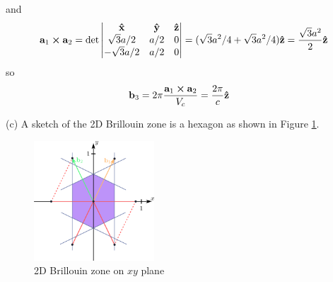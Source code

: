 \documentclass[../main.tex]{subfiles}
\begin{document}
and 
\begin{align*}
    \vb{a}_1 \cross \vb{a}_2 = \det\begin{vmatrix}
        \vu{x} & \vu{y} & \vu{z} \\
        \sqrt{3}a/2 & a/2 & 0 \\
        -\sqrt{3}a/2 & a/2 & 0
    \end{vmatrix} = (\sqrt{3}a^2/4 + \sqrt{3}a^2/4) \vu{z} = \frac{\sqrt{3}a^2}{2} \vu{z}
\end{align*}
so
\begin{align*}
    \vb{b}_3 &= 2\pi \frac{\vb{a}_1 \cross \vb{a}_2}{V_c} = \frac{2\pi}{c} \vu{z}
\end{align*}

(c) A sketch of the 2D Brillouin zone is a hexagon as shown in Figure \ref{fig:hw1_2}.
\begin{figure}[ht]
    \centering
    \includegraphics[width=0.4\textwidth]{hw1_2.png}
    \caption{2D Brillouin zone on $xy$ plane}
    \label{fig:hw1_2}
\end{figure}
\end{document}
